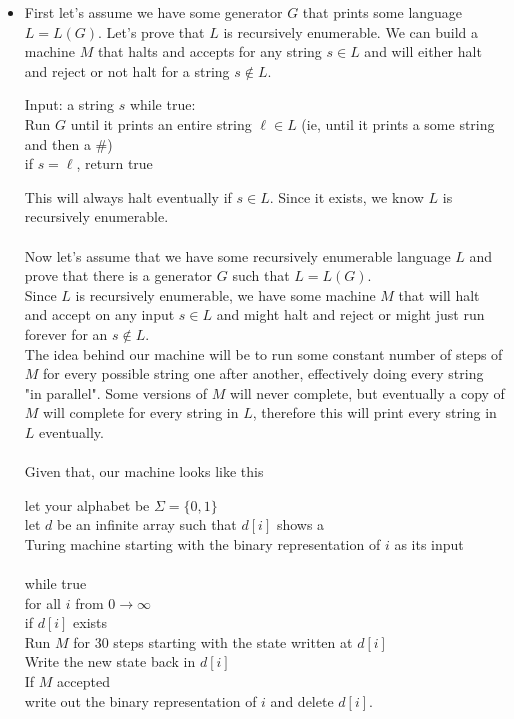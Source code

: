 \documentclass[11pt]{article}
\begin{document}
\begin{solution}
\begin{itemize}
        \item First let's assume we have some generator $G$ that prints some language $L = L(G)$. Let's prove that $L$ is recursively enumerable. 
            We can build a machine $M$ that halts and accepts for any string $s \in L$ and will either halt and reject or not halt for a string $s \not \in L$.
            \begin{algo}
                Input: a string $s$
                while true: \+
                \\ Run $G$ until it prints an entire string $\ell \in L$ (ie, until it prints a some string and then a \#)
                \\ if $s = \ell$, return true
            \end{algo}
            This will always halt eventually if $s \in L$. Since it exists, we know $L$ is recursively enumerable.
            \\ \\ Now let's assume that we have some recursively enumerable language $L$ and prove that there is a generator $G$ such that $L = L(G)$.
            \\ Since $L$ is recursively enumerable, we have some machine $M$ that will halt and accept on any input $s \in L$ and might halt and reject or might just run forever for an $s \not \in L$.
            \\ The idea behind our machine will be to run some constant number of steps of $M$ for every possible string one after another, effectively doing every string "in parallel". Some versions of 
            $M$ will never complete, but eventually a copy of $M$ will complete for every string in $L$, therefore this will print every string in $L$ eventually.
            \\ \\ Given that, our machine looks like this
            \begin{algo}
                let your alphabet be $\Sigma = \{0, 1\}$
                \\ let $d$ be an infinite array such that $d[i]$ shows a 
                \\ Turing machine starting with the binary representation of $i$ as its input
                \\ \\ while true \+
                \\ for all $i$ from $0 \rightarrow \infty$ \+
                \\ if $d[i]$ exists \+
                \\ Run $M$ for 30 steps starting with the state written at $d[i]$ 
                \\ Write the new state back in $d[i]$
                \\ If $M$ accepted \+
                \\ write out the binary representation of $i$ and delete $d[i]$.
            \end{algo}
    \end{itemize}
\end{solution}
\end{document}
